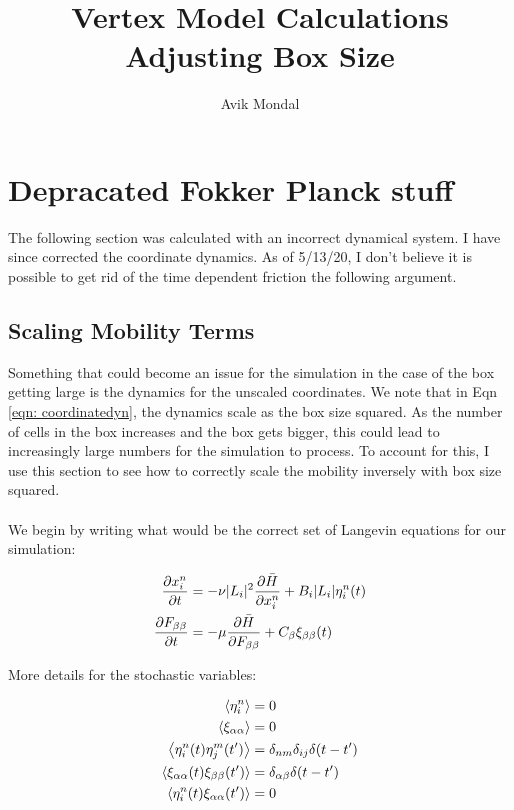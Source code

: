 \documentclass[12pt]{article}
\begin{document}
\title{ Vertex Model Calculations \\ {\normalsize Adjusting Box Size}}
\author{Avik Mondal}
\maketitle 
\tableofcontents
\section{Depracated Fokker Planck stuff}
The following section was calculated with an incorrect dynamical system. I have since corrected the coordinate dynamics. As of 5/13/20, I don't  believe it is possible to get rid of the time dependent friction the following argument.
\subsection{Scaling Mobility Terms}
Something that could become an issue for the simulation in the case of the box getting large is the dynamics for the unscaled coordinates. We note that in Eqn \ref{eqn: coordinatedyn}, the dynamics scale as the box size squared. As the number of cells in the box increases and the box gets bigger, this could lead to increasingly large numbers for the simulation to process. To account for this, I use this section to see how to correctly scale the mobility inversely with box size squared. \\ \\
We begin by writing what would be the correct set of Langevin equations for our simulation:
\begin{center}
\begin{equation}
\label{eqn: brownianydn}
\begin{split}
\pdv{x_i^n}{t} &= -\nu |L_i|^2 \pdv{\bar{H}}{x_i^n} + B_i |L_i| \eta_i^n(t)\\
\pdv{F_{\beta\beta}}{t} &= -\mu \pdv{\bar{H}}{F_{\beta\beta}} + C_\beta \xi_{\beta\beta}(t)\\
\end{split}
\end{equation}
\end{center}
More details for the stochastic variables:
\begin{center}
\begin{equation}
\begin{split}
\expval{\eta_i^n} &= 0\\
\expval{\xi_{\alpha\alpha}} &= 0\\
\expval{\eta_i^n(t) \eta_j^m(t') } &= \delta_{nm} \delta_{ij} \delta(t-t')\\
\expval{\xi_{\alpha\alpha}(t) \xi_{\beta\beta}(t')} &= \delta_{\alpha\beta} \delta(t-t')\\
\expval{\eta_i^n(t) \xi_{\alpha\alpha}(t')} &= 0\\
\end{split}
\end{equation}
\end{center}
\end{document}
